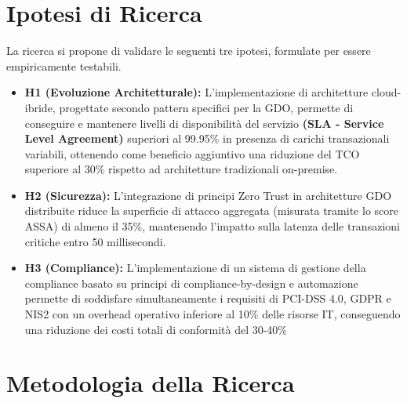 \section{Ipotesi di Ricerca}
La ricerca si propone di validare le seguenti tre ipotesi, formulate per essere empiricamente testabili.
\begin{itemize}
    \item \textbf{H1 (Evoluzione Architetturale):} L'implementazione di architetture cloud-ibride, progettate secondo pattern specifici per la GDO, permette di conseguire e mantenere livelli di disponibilità del servizio \textbf{(SLA - Service Level Agreement)} superiori al 99.95\% in presenza di carichi transazionali variabili, ottenendo come beneficio aggiuntivo una riduzione del TCO superiore al 30\% rispetto ad architetture tradizionali on-premise.
    \item \textbf{H2 (Sicurezza):} L'integrazione di principi Zero Trust in architetture GDO distribuite riduce la superficie di attacco aggregata (misurata tramite lo score ASSA) di almeno il 35\%, mantenendo l'impatto sulla latenza delle transazioni critiche entro 50 millisecondi.
    \item \textbf{H3 (Compliance):} L'implementazione di un sistema di gestione della compliance basato su principi di compliance-by-design e automazione permette di soddisfare simultaneamente i requisiti di PCI-DSS 4.0, GDPR e NIS2 con un overhead operativo inferiore al 10\% delle risorse IT, conseguendo una riduzione dei costi totali di conformità del 30-40\%
\end{itemize}
\section{Metodologia della Ricerca}

